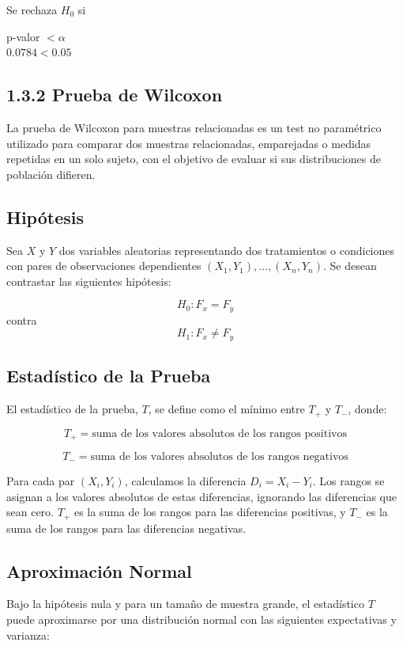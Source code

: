 \documentclass{article}
\begin{document}
Se rechaza $H_0$ si

p-valor $ < \alpha$ \\
$0.0784 < 0.05$

\subsection{1.3.2 Prueba de Wilcoxon}

La prueba de Wilcoxon para muestras relacionadas es un test no paramétrico utilizado para comparar dos muestras relacionadas, emparejadas o medidas repetidas en un solo sujeto, con el objetivo de evaluar si sus distribuciones de población difieren.

\subsection*{Hipótesis}

Sea $X$ y $Y$ dos variables aleatorias representando dos tratamientos o condiciones con pares de observaciones dependientes $(X_1, Y_1),\dots ,(X_n, Y_n)$. Se desean contrastar las siguientes hipótesis:

\[
    H_0: F_x = F_y
\]
contra
\[
    H_1: F_x \neq F_y
\]

\subsection*{Estadístico de la Prueba}

El estadístico de la prueba, $T$, se define como el mínimo entre $T_{+}$ y $T_{-}$, donde:

\[
    T_{+} = \text{suma de los valores absolutos de los rangos positivos}
\]

\[
    T_{-} = \text{suma de los valores absolutos de los rangos negativos}
\]

Para cada par $(X_i, Y_i)$, calculamos la diferencia $D_i = X_i - Y_i$. Los rangos se asignan a los valores absolutos de estas diferencias, ignorando las diferencias que sean cero. $T_{+}$ es la suma de los rangos para las diferencias positivas, y $T_{-}$ es la suma de los rangos para las diferencias negativas.

\subsection*{Aproximación Normal}

Bajo la hipótesis nula y para un tamaño de muestra grande, el estadístico $T$ puede aproximarse por una distribución normal con las siguientes expectativas y varianza:
\end{document}
